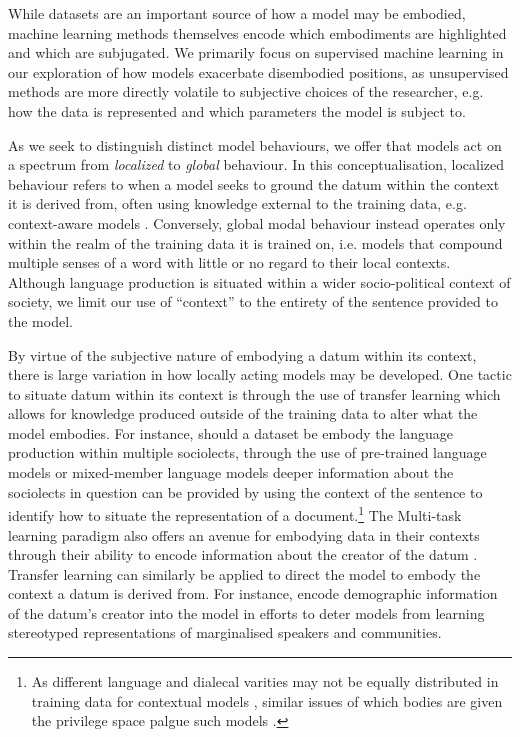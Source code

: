 While datasets are an important source of how a model may be embodied, machine learning methods themselves encode which embodiments are highlighted and which are subjugated. We primarily focus on supervised machine learning in our exploration of how models exacerbate disembodied positions, as unsupervised methods are more directly volatile to subjective choices of the researcher, e.g. how the data is represented and which parameters the model is subject to.

As we seek to distinguish distinct model behaviours, we offer that models act on a spectrum from \textit{localized} to \textit{global} behaviour. In this conceptualisation, localized behaviour refers to when a model seeks to ground the datum within the context it is derived from, often using knowledge external to the training data, e.g. context-aware models \cite{Garcia:2019,Devlin:2019}. Conversely, global modal behaviour instead operates only within the realm of the training data it is trained on, i.e. models that compound multiple senses of a word with little or no regard to their local contexts. Although language production is situated within a wider socio-political context of society, we limit our use of ``context'' to the entirety of the sentence provided to the model.

By virtue of the subjective nature of embodying a datum within its context, there is large variation in how locally acting models may be developed. One tactic to situate datum within its context is through the use of transfer learning which allows for knowledge produced outside of the training data to alter what the model embodies. For instance, should a dataset be embody the language production within multiple sociolects, through the use of pre-trained language models \cite{Devlin:2019} or mixed-member language models \cite{Blodgett:2016} deeper information about the sociolects in question can be provided by using the context of the sentence to identify how to situate the representation of a document.\footnote{As different language and dialecal varities may not be equally distributed in training data for contextual models \cite{Dunn:2020}, similar issues of which bodies are given the privilege space palgue such models \cite{Tan-Celis:2019}.} The Multi-task learning paradigm also offers an avenue for embodying data in their contexts through their ability to encode information about the creator of the datum \cite{Benton:2017,Garcia:2019}. Transfer learning can similarly be applied to direct the model to embody the context a datum is derived from. For instance, \citet{Romanov:2019} encode demographic information of the datum's creator into the model in efforts to deter models from learning stereotyped representations of marginalised speakers and communities.

